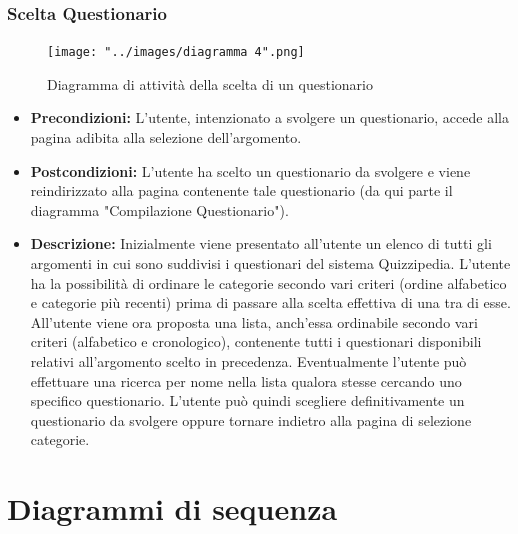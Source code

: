 \documentclass[a4paper,11pt]{article}
\begin{document}
\subsubsection{Scelta Questionario}
\begin{figure}[h!]
\begin{center}
	\texttt{[image: "../images/diagramma 4".png]}
	\caption{Diagramma di attività della scelta di un questionario}
\end{center}
\end{figure}
\begin{itemize}
\item\textbf{Precondizioni:} L'utente, intenzionato a svolgere un questionario, accede alla pagina adibita alla selezione dell'argomento.
\item\textbf{Postcondizioni:} L'utente ha scelto un questionario da svolgere e viene reindirizzato alla pagina contenente tale questionario (da qui parte il diagramma "Compilazione Questionario").
\item\textbf{Descrizione:} Inizialmente viene presentato all'utente un elenco di tutti gli argomenti in cui sono suddivisi i questionari del sistema Quizzipedia. L'utente ha la possibilità di ordinare le categorie secondo vari criteri (ordine alfabetico e categorie più recenti) prima di passare alla scelta effettiva di una tra di esse. All'utente viene ora proposta una lista, anch'essa ordinabile secondo vari criteri (alfabetico e cronologico), contenente tutti i questionari disponibili relativi all'argomento scelto in precedenza. Eventualmente l'utente può effettuare una ricerca per nome nella lista qualora stesse cercando uno specifico questionario. L'utente può quindi scegliere definitivamente un questionario da svolgere oppure tornare indietro alla pagina di selezione categorie.
\end{itemize}
\newpage

	\section{Diagrammi di sequenza}
\end{document}
